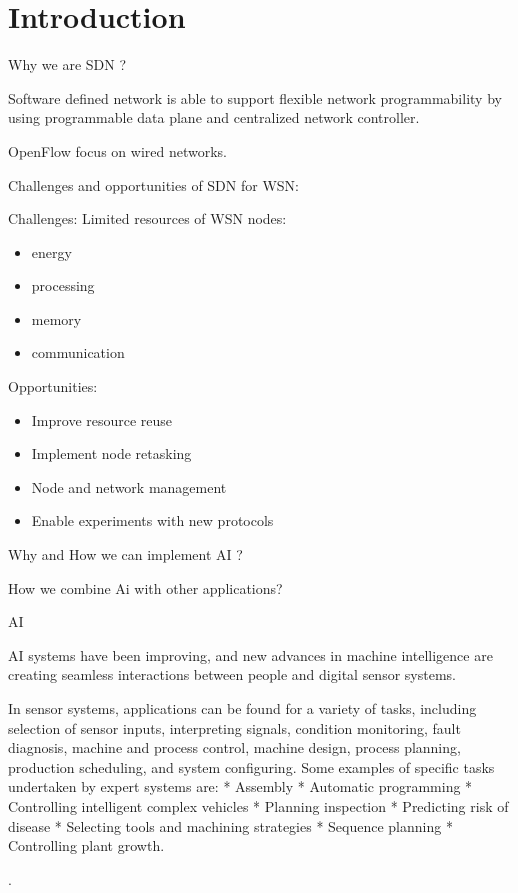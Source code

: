 \section{Introduction}

Why we are SDN ?

Software defined network is able to support flexible network programmability 
by using programmable data plane and centralized network controller.

OpenFlow focus on wired networks.

Challenges and opportunities of SDN for WSN:

Challenges: Limited resources of WSN nodes:
\begin{itemize}
\item	energy
\item	processing
\item	memory
\item	communication
\end{itemize}

Opportunities: 
\begin{itemize}
\item	Improve resource reuse
\item	Implement node retasking 
\item	Node and network management
\item	Enable experiments with new protocols
\end{itemize}



Why and How we can implement AI ?

How we combine Ai with other applications?


AI 

AI systems have been improving, and new advances in machine intelligence are creating seamless interactions between people and digital sensor systems.

 In sensor systems, applications can be found for a variety of tasks, including selection of sensor inputs, interpreting signals, condition monitoring, fault diagnosis, machine and process control, machine design, process planning, production scheduling, and system configuring. Some examples of specific tasks undertaken by expert systems are:
* Assembly 
* Automatic programming 
* Controlling intelligent complex vehicles  
* Planning inspection 
* Predicting risk of disease 
* Selecting tools and machining strategies 
* Sequence planning 
* Controlling plant growth. 

.




